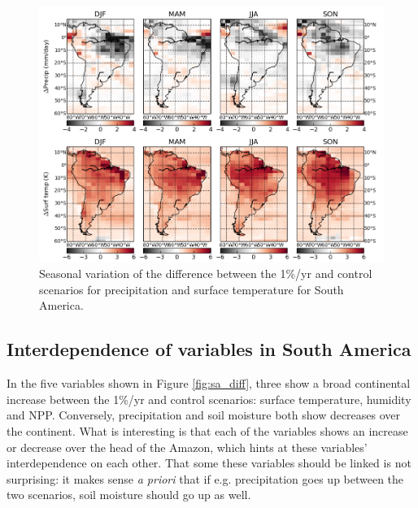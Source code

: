 \documentclass{article}
\begin{document}
\begin{figure}[hbp]
    \centering
    \includegraphics[width=\textwidth]{figures/sa_seasonal}
    \caption{Seasonal variation of the difference between the 1\%/yr and control scenarios for precipitation and surface temperature for South America.}
    \label{fig:sa_seasonal}
\end{figure}

\newpage

\subsection{Interdependence of variables in South America}

In the five variables shown in Figure \ref{fig:sa_diff}, three show a broad continental increase between the 1\%/yr and control scenarios: surface temperature, humidity and NPP. Conversely, precipitation and soil moisture both show decreases over the continent. What is interesting is that each of the variables shows an increase or decrease over the head of the Amazon, which hints at these variables' interdependence on each other. That some these variables should be linked is not surprising: it makes sense \textit{a priori} that if e.g. precipitation goes up between the two scenarios, soil moisture should go up as well. 
\end{document}
